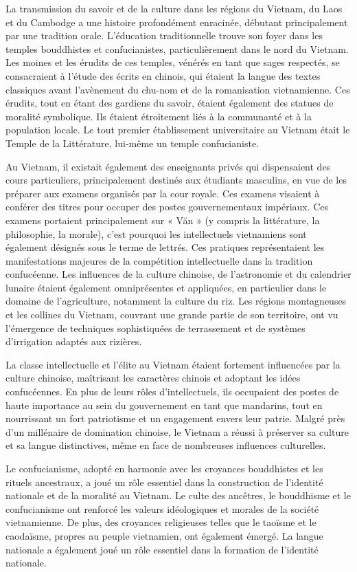 La transmission du savoir et de la culture dans les régions du Vietnam, du Laos et du Cambodge a une histoire profondément enracinée, débutant principalement par une tradition orale. L'éducation traditionnelle trouve son foyer dans les temples bouddhistes et confucianistes, particulièrement dans le nord du Vietnam. Les moines et les érudits de ces temples, vénérés en tant que sages respectés, se consacraient à l'étude des écrits en chinois, qui étaient la langue des textes classiques avant l'avènement du chu-nom et de la romanisation vietnamienne. Ces érudits, tout en étant des gardiens du savoir, étaient également des statues de moralité symbolique. Ils étaient étroitement liés à la communauté et à la population locale. Le tout premier établissement universitaire au Vietnam était le Temple de la Littérature, lui-même un temple confucianiste.

Au Vietnam, il existait également des enseignants privés qui dispensaient des cours particuliers, principalement destinés aux étudiants masculins, en vue de les préparer aux examens organisés par la cour royale. Ces examens visaient à conférer des titres pour occuper des postes gouvernementaux impériaux. Ces examens portaient principalement sur « Văn » (y compris la littérature, la philosophie, la morale), c'est pourquoi les intellectuels vietnamiens sont également désignés sous le terme de lettrés. Ces pratiques représentaient les manifestations majeures de la compétition intellectuelle dans la tradition confucéenne. Les influences de la culture chinoise, de l'astronomie et du calendrier lunaire étaient également omniprésentes et appliquées, en particulier dans le domaine de l'agriculture, notamment la culture du riz. 
Les régions montagneuses et les collines du Vietnam, couvrant une grande partie de son territoire, ont vu l'émergence de techniques sophistiquées de terrassement et de systèmes d'irrigation adaptés aux rizières.

La classe intellectuelle et l'élite au Vietnam étaient fortement influencées par la culture chinoise, maîtrisant les caractères chinois et adoptant les idées confucéennes. En plus de leurs rôles d'intellectuels, ils occupaient des postes de haute importance au sein du gouvernement en tant que mandarins, tout en nourrissant un fort patriotisme et un engagement envers leur patrie. Malgré près d'un millénaire de domination chinoise, le Vietnam a réussi à préserver sa culture et sa langue distinctives, même en face de nombreuses influences culturelles.

Le confucianisme, adopté en harmonie avec les croyances bouddhistes et les rituels ancestraux, a joué un rôle essentiel dans la construction de l'identité nationale et de la moralité au Vietnam. Le culte des ancêtres, le bouddhisme et le confucianisme ont renforcé les valeurs idéologiques et morales de la société vietnamienne. De plus, des croyances religieuses telles que le taoïsme et le caodaïsme, propres au peuple vietnamien, ont également émergé. La langue nationale a également joué un rôle essentiel dans la formation de l'identité nationale.

